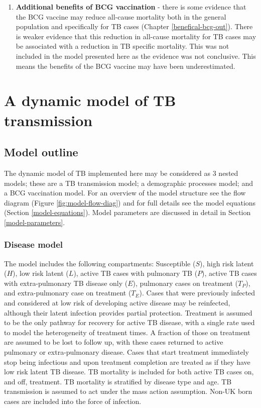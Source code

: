 \documentclass[11pt,twoside]{bristolthesis}
\begin{document}
\begin{enumerate}
  \item
    \textbf{Additional benefits of BCG vaccination} - there is some evidence that the BCG vaccine may reduce all-cause mortality both in the general population and specifically for TB cases (Chapter \ref{benefical-bcg-out}). There is weaker evidence that this reduction in all-cause mortality for TB cases may be associated with a reduction in TB specific mortality. This was not included in the model presented here as the evidence was not conclusive. This means the benefits of the BCG vaccine may have been underestimated.
  \end{enumerate}
  \hypertarget{a-dynamic-model-of-tb-transmission}{%
  \section{A dynamic model of TB transmission}\label{a-dynamic-model-of-tb-transmission}}
  
  \hypertarget{model-outline}{%
  \subsection{Model outline}\label{model-outline}}
  
  The dynamic model of TB implemented here may be considered as 3 nested models; these are a TB transmission model; a demographic processes model; and a BCG vaccination model. For an overview of the model structure see the flow diagram (Figure \ref{fig:model-flow-diag}) and for full details see the model equations (Section \ref{model-equations}). Model parameters are discussed in detail in Section \ref{model-parameters}.
  
  \hypertarget{disease-model}{%
  \subsubsection{Disease model}\label{disease-model}}
  
  The model includes the following compartments: Susceptible (\(S\)), high risk latent (\(H\)), low risk latent (\(L\)), active TB cases with pulmonary TB (\(P\)), active TB cases with extra-pulmonary TB disease only (\(E\)), pulmonary cases on treatment (\(T_P\)), and extra-pulmonary case on treatment (\(T_E\)). Cases that were previously infected and considered at low risk of developing active disease may be reinfected, although their latent infection provides partial protection. Treatment is assumed to be the only pathway for recovery for active TB disease, with a single rate used to model the heterogeneity of treatment times. A fraction of those on treatment are assumed to be lost to follow up, with these cases returned to active pulmonary or extra-pulmonary disease. Cases that start treatment immediately stop being infectious and upon treatment completion are treated as if they have low risk latent TB disease. TB mortality is included for both active TB cases on, and off, treatment. TB mortality is stratified by disease type and age. TB transmission is assumed to act under the mass action assumption. Non-UK born cases are included into the force of infection.
  
\end{document}
